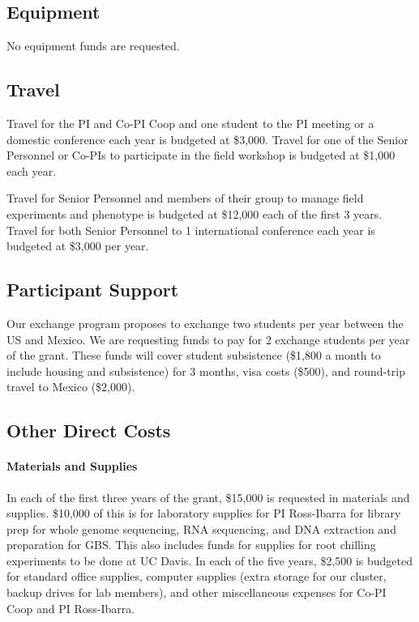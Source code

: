 \subsection*{Equipment}

No equipment funds are requested.

\subsection*{Travel}

Travel for the PI and Co-PI Coop and one student to the PI meeting or a domestic conference each year is budgeted at \$3,000.  Travel for one of the Senior Personnel or Co-PIs to participate in the field workshop is budgeted at \$1,000 each year.

Travel for Senior Personnel and members of their group to manage field experiments and phenotype is budgeted at \$12,000 each of the first 3 years. Travel for both Senior Personnel to 1 international conference each year is budgeted at \$3,000 per year.

\subsection*{Participant Support}
Our exchange program proposes to exchange two students per year between the US and Mexico.  We are requesting funds to pay for 2 exchange students per year of the grant. These funds will cover student subsistence (\$1,800 a month to include housing and subsistence) for 3 months, visa costs (\$500), and round-trip travel to Mexico (\$2,000).

\subsection*{Other Direct Costs}

 \paragraph{Materials and Supplies}
In each of the first three years of the grant, \$15,000 is requested in materials and supplies.  \$10,000 of this is for laboratory supplies for PI Ross-Ibarra for library prep for whole genome sequencing, RNA sequencing, and DNA extraction and preparation for GBS.  This also includes funds for supplies for root chilling experiments to be done at UC Davis.  In each of the five years, \$2,500 is budgeted for standard office supplies, computer supplies (extra storage for our cluster, backup drives for lab members), and other miscellaneous expenses for Co-PI Coop and PI Ross-Ibarra. 

